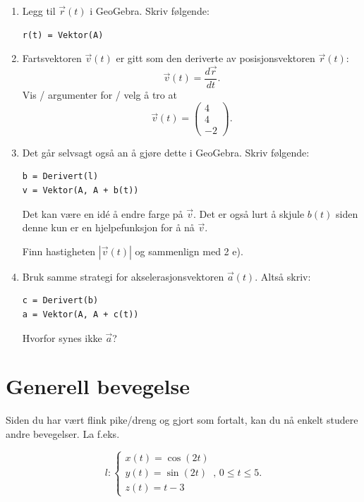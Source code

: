 \documentclass[a4paper,12pt]{article}
\begin{document}
\begin{enumerate}[label=\alph*)]
\item Legg til $\vec r (t)$ i GeoGebra. Skriv følgende:
\begin{lstlisting}
r(t) = Vektor(A)
\end{lstlisting}

\item Fartsvektoren $\vec v(t)$ er gitt som den deriverte av posisjonsvektoren $\vec r(t)$:
\[ \vec v(t) = \frac{d\vec r}{dt}. 
\]
Vis / argumenter for / velg å tro at \[ \vec v(t) = \begin{pmatrix}
4 \\
4 \\
-2
\end{pmatrix}.\]

\item Det går selvsagt også an å gjøre dette i GeoGebra. Skriv følgende:
\begin{lstlisting}
b = Derivert(l)
v = Vektor(A, A + b(t))
\end{lstlisting}
Det kan være en idé å endre farge på $\vec v$. Det er også lurt å skjule $b(t)$ siden denne kun er en hjelpefunksjon for å nå $\vec v$.\newline

Finn hastigheten $|\vec v(t)|$ og sammenlign med 2 e).

\item Bruk samme strategi for akselerasjonsvektoren $\vec a(t)$. Altså skriv:
\begin{lstlisting}
c = Derivert(b)
a = Vektor(A, A + c(t))
\end{lstlisting}

Hvorfor synes ikke $\vec a$?

\end{enumerate}


\section*{Generell bevegelse}

Siden du har vært flink pike/dreng og gjort som fortalt, kan du nå enkelt studere andre bevegelser. La f.eks.

\[
l:
\begin{cases}
x(t)=\cos(2t) \\
y(t)=\sin(2t) \\
z(t) = t - 3
\end{cases},\, 0\leq t \leq 5.
\]
\end{document}
